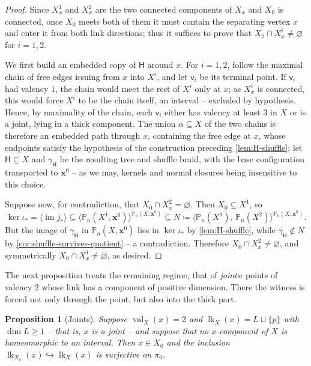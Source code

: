 \documentclass[reqno]{amsart}
\newtheorem{proposition}[theorem]{Proposition}
\theoremstyle{definition}
\newcommand\bfx{\mathbf{x}}
\newcommand\sfH{\mathsf{H}}
\newcommand\sfv{\mathsf{v}}
\newcommand{\PB}{\mathbb{P}}
\newcommand{\im}{\operatorname{im}}
\newcommand{\co}[1]{\mathopen{\langle}#1\mathclose{\rangle}} %
\newcommand{\base}{\bfx^0}
\DeclareMathOperator{\lk}{lk}
\DeclareMathOperator{\val}{val}
\numberwithin{equation}{section}
\begin{document}
\begin{proof}
Since \(X^1_x\) and \(X^2_x\) are the two connected components
of \(X_x\) and \(X_0\) is connected, once \(X_0\) meets both of
them it must contain the separating vertex \(x\) and enter it
from both link directions; thus it suffices to prove that
\(X_0\cap X^i_x\neq\varnothing\) for \(i=1,2\).

We first build an embedded copy of \(\sfH\) around \(x\). For
\(i=1,2\), follow the maximal chain of free edges issuing from
\(x\) into \(X^i\), and let \(\sfv_i\) be its terminal point. If
\(\sfv_i\) had valency \(1\), the chain would meet the rest of
\(X^i\) only at \(x\); as \(X^i_x\) is connected, this would
force \(X^i\) to be the chain itself, an interval -- excluded by
hypothesis. Hence, by maximality of the chain, each \(\sfv_i\)
either has valency at least \(3\) in \(X\) or is a joint, lying
in a thick component. The union
\(\alpha\subseteq X\) of the two chains is therefore an embedded
path through \(x\), containing the free edge at \(x\), whose
endpoints satisfy the hypothesis of the construction preceding
\cref{lem:H-shuffle}; let \(\sfH\subseteq X\) and
\(\gamma_\sfH\) be the resulting tree and shuffle braid, with
the base configuration transported to \(\base\) -- as we may,
kernels and normal closures being insensitive to this choice.

Suppose now, for contradiction, that
\(X_0\cap X^2_x=\varnothing\). Then \(X_0\subseteq X^1\), so
\[
\ker\iota_\ast=\co{\im j_\ast}
\subseteq\co{\PB_n(X^1,\base)}^{\PB_n(X,\base)}
\subseteq N\coloneqq
\co{\PB_n(X^1),\,\PB_n(X^2)}^{\PB_n(X,\base)} .
\]
But the image of \(\gamma_\sfH\) in \(\PB_n(X,\base)\) lies in
\(\ker\iota_\ast\) by \cref{lem:H-shuffle}, while
\(\gamma_\sfH\notin N\) by
\cref{cor:shuffle-survives-quotient} -- a contradiction.
Therefore \(X_0\cap X^2_x\neq\varnothing\), and symmetrically
\(X_0\cap X^1_x\neq\varnothing\), as desired.
\end{proof}

The next proposition treats the remaining regime, that of
\emph{joints}: points of valency \(2\) whose link has a
component of positive dimension. There the witness is forced not
only through the point, but also into the thick part.

\begin{proposition}[Joints]\label{prop:X0-meets-link-joint}
Suppose \(\val_X(x)=2\) and
\(\lk_X(x)=L\sqcup\{p\}\) with \(\dim L\geq1\) -- that is,
\(x\) is a joint -- and suppose that no \(x\)-component of
\(X\) is homeomorphic to an interval. Then \(x\in X_0\) and the
inclusion \(\lk_{X_0}(x)\hookrightarrow\lk_X(x)\) is surjective
on \(\pi_0\).
\end{proposition}
\end{document}
